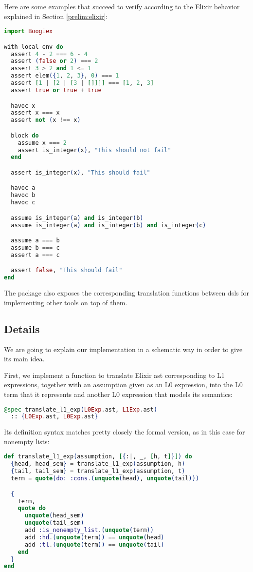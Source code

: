 Here are some examples that succeed to verify according to the Elixir behavior 
explained in Section \ref{prelim:elixir}:

\begin{lstlisting}[language=elixir,numbers=none,frame=none]
import Boogiex

with_local_env do
  assert 4 - 2 === 6 - 4
  assert (false or 2) === 2
  assert 3 > 2 and 1 <= 1
  assert elem({1, 2, 3}, 0) === 1
  assert [1 | [2 | [3 | []]]] === [1, 2, 3]
  assert true or true + true

  havoc x
  assert x === x
  assert not (x !== x)

  block do
    assume x === 2
    assert is_integer(x), "This should not fail"
  end

  assert is_integer(x), "This should fail"

  havoc a
  havoc b
  havoc c

  assume is_integer(a) and is_integer(b)
  assume is_integer(a) and is_integer(b) and is_integer(c)

  assume a === b
  assume b === c
  assert a === c

  assert false, "This should fail"
end
\end{lstlisting}

The package also exposes the corresponding translation functions between
\gls{dsl}s for implementing other tools on top of them.

\subsection{Details}
\label{ir:details}

We are going to explain our implementation in a schematic way in order to give
its main idea. 

First, we implement a function to translate Elixir \gls{ast} corresponding to L1
expressions, together with an assumption given as an L0 expression, into the L0
term that it represents and another L0 expression that models its semantics:

\begin{lstlisting}[language=elixir,numbers=none,frame=none]
@spec translate_l1_exp(L0Exp.ast, L1Exp.ast) 
  :: {L0Exp.ast, L0Exp.ast}
\end{lstlisting}

Its definition syntax matches pretty closely the formal version, as in this case
for nonempty lists:

\begin{lstlisting}[language=elixir,numbers=none,frame=none]
def translate_l1_exp(assumption, [{:|, _, [h, t]}]) do
  {head, head_sem} = translate_l1_exp(assumption, h)
  {tail, tail_sem} = translate_l1_exp(assumption, t)
  term = quote(do: :cons.(unquote(head), unquote(tail)))

  {
    term,
    quote do
      unquote(head_sem)
      unquote(tail_sem)
      add :is_nonempty_list.(unquote(term))
      add :hd.(unquote(term)) == unquote(head)
      add :tl.(unquote(term)) == unquote(tail)
    end
  }
end
\end{lstlisting}

